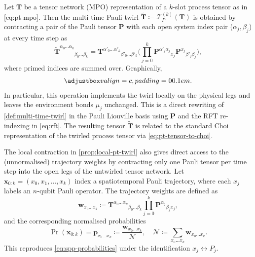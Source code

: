 \begin{proposition}\label{prop:local-pt-twirl}
  Let \(\mathbf{T}\) be a tensor network (MPO) representation of a \(k\)-slot process tensor as in \cref{eq:pt-mpo}. Then the multi-time Pauli twirl \(\widetilde{\mathbf{T}} \coloneq \mathcal{T}_P^{(k)}(\mathbf{T})\) is obtained by contracting a pair of the Pauli tensor \(\mathbf{P}\) with each open system index pair (\(\alpha_j, \beta_j\)) at every time step as
  \begin{equation}\label{eq:pt-twirl-tensor}
    \widetilde{\mathbf{T}}^{\alpha_0\dots \alpha_k}{}_{\beta_0 \dots \beta_k} = 
    \mathbf{T}^{\alpha'_0 \dots \alpha'_k}{}_{\beta'_0 \dots \beta'_k}
    \Bigg(
    \prod_{j=0}^k
      \mathbf{P}^{\alpha'_j\alpha_j}{}_{x_j}
      \mathbf{P}^{x_j}{}_{\beta'_j\beta_j}
    \Bigg),
  \end{equation}
  where primed indices are summed over. Graphically,
  \begin{equation}
    \valignbox{}.
  \end{equation}
  In particular, this operation implements the twirl locally on the physical legs and leaves the environment bonds \(\mu_j\) unchanged. This is a direct rewriting of \cref{def:multi-time-twirl} in the Pauli Liouville basis using \(\mathbf{P}\) and the RFT re-indexing in \cref{eq:rft}. The resulting tensor \(\widetilde{\mathbf{T}}\) is related to the standard Choi representation of the twirled process tensor via \cref{eq:pt-tensor-to-choi}.
\end{proposition}

The local contraction in \cref{prop:local-pt-twirl} also gives direct access to the (unnormalised) trajectory weights by contracting only one Pauli tensor per time step into the open legs of the untwirled tensor network. Let \(\mathbf{x}_{0:k} = (x_0, x_1, \ldots, x_k)\) index a spatiotemporal Pauli trajectory, where each \(x_j\) labels an \(n\)-qubit Pauli operator. The trajectory weights are defined as
\begin{equation}\label{eq:spp-weights}
  \mathbf{w}_{x_0\dots x_k} 
  \coloneq
  \mathbf{T}^{\alpha_0 \dots \alpha_k}{}_{\beta_0 \dots \beta_k} \prod_{j=0}^k \mathbf{P}^{\alpha_j}{}_{\beta_jx_j},
\end{equation}
and the corresponding normalised probabilities
\begin{equation}\label{eq:spp-prob-tensor}
  \Pr(\mathbf{x}_{0:k}) = \mathbf{p}_{x_0\dots x_k} \coloneq \frac{\mathbf{w}_{x_0\dots x_k}}{\mathcal{N}}, 
  \quad
  \mathcal{N} \coloneq \sum_{x_0\dots x_k} \mathbf{w}_{x_0\dots x_k}.
\end{equation}
This reproduces \cref{eq:spp-probabilities} under the identification \(x_j \leftrightarrow P_j\).

